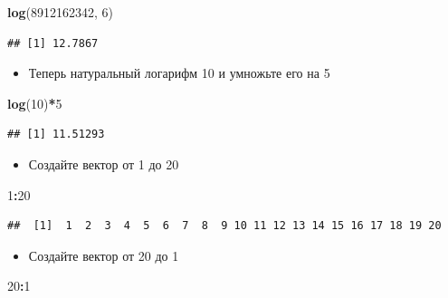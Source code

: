 \documentclass[]{book}
\newenvironment{Shaded}{\begin{snugshade}}{\end{snugshade}}
\newcommand{\KeywordTok}[1]{\textcolor[rgb]{0.13,0.29,0.53}{\textbf{#1}}}
\newcommand{\DecValTok}[1]{\textcolor[rgb]{0.00,0.00,0.81}{#1}}
\newcommand{\OperatorTok}[1]{\textcolor[rgb]{0.81,0.36,0.00}{\textbf{#1}}}
\newcommand{\NormalTok}[1]{#1}
\providecommand{\tightlist}{%
  \setlength{\itemsep}{0pt}\setlength{\parskip}{0pt}}
\begin{document}
\begin{Shaded}
\begin{Highlighting}[]
\KeywordTok{log}\NormalTok{(}\DecValTok{8912162342}\NormalTok{, }\DecValTok{6}\NormalTok{)}
\end{Highlighting}
\end{Shaded}

\begin{verbatim}
## [1] 12.7867
\end{verbatim}

\begin{itemize}
\tightlist
\item
  Теперь натуральный логарифм 10 и умножьте его на 5
\end{itemize}

\begin{Shaded}
\begin{Highlighting}[]
\KeywordTok{log}\NormalTok{(}\DecValTok{10}\NormalTok{)}\OperatorTok{*}\DecValTok{5}
\end{Highlighting}
\end{Shaded}

\begin{verbatim}
## [1] 11.51293
\end{verbatim}

\begin{itemize}
\tightlist
\item
  Создайте вектор от 1 до 20
\end{itemize}

\begin{Shaded}
\begin{Highlighting}[]
\DecValTok{1}\OperatorTok{:}\DecValTok{20}
\end{Highlighting}
\end{Shaded}

\begin{verbatim}
##  [1]  1  2  3  4  5  6  7  8  9 10 11 12 13 14 15 16 17 18 19 20
\end{verbatim}

\begin{itemize}
\tightlist
\item
  Создайте вектор от 20 до 1
\end{itemize}

\begin{Shaded}
\begin{Highlighting}[]
\DecValTok{20}\OperatorTok{:}\DecValTok{1}
\end{Highlighting}
\end{Shaded}
\end{document}
